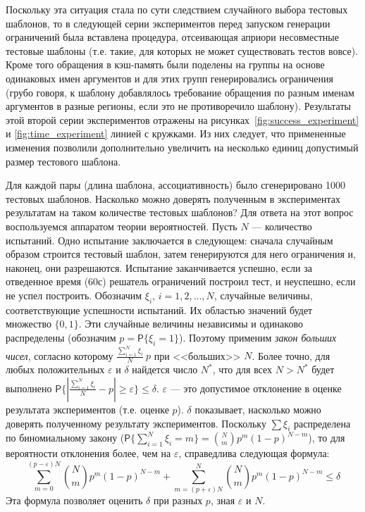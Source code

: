 \documentclass[14pt]{extreport}
\begin{document}
Поскольку эта ситуация стала по сути следствием случайного выбора тестовых
шаблонов, то в следующей серии экспериментов перед запуском генерации
ограничений была вставлена процедура, отсеивающая априори несовместные тестовые
шаблоны (т.е. такие, для которых не может существовать тестов вовсе). Кроме того
обращения в кэш-память были поделены на группы на основе одинаковых имен
аргументов и для этих групп генерировались ограничения (грубо говоря, к шаблону
добавлялось требование обращения по разным именам аргументов в разные регионы,
если это не противоречило шаблону). Результаты этой второй серии экспериментов
отражены на рисунках~\ref{fig:success_experiment} и \ref{fig:time_experiment}
линией с кружками. Из них следует, что примененные изменения позволили
дополнительно увеличить на несколько единиц допустимый размер тестового шаблона.

Для каждой пары (длина шаблона, ассоциативность) было сгенерировано 1000
тестовых шаблонов. Насколько можно доверять полученным в экспериментах
результатам на таком количестве тестовых шаблонов? Для ответа на этот вопрос воспользуемся аппаратом теории
вероятностей. Пусть $N$ --- количество испытаний. Одно испытание заключается в
следующем: сначала случайным образом строится тестовый шаблон, затем генерируются
для него ограничения и, наконец, они разрешаются. Испытание заканчивается успешно, если за отведенное время (60с) решатель ограничений построил тест, и неуспешно, если не успел построить.
Обозначим  $\xi_i$, $i = 1, 2, \dots, N$, случайные величины, соответствующие
успешности испытаний. Их областью значений будет множество $\{0, 1\}$. Эти
случайные величины независимы и одинаково распределены (обозначим $p =
\mathsf{P}\{\xi_i = 1\}$). Поэтому применим \emph{закон больших чисел}, согласно
которому $\frac{\sum_{i=1}^N \xi_i}{N} ~ p$ при <<больших>> $N$. Более точно, для любых
положительных $\varepsilon$ и $\delta$ найдется число $N^*$, что для всех $N > N^*$ будет
выполнено $\mathsf{P}\{|\frac{\sum_{i=1}^N \xi_i}{N} - p | \geq \varepsilon\} \leq \delta$. $\varepsilon$ --- это допустимое отклонение в оценке результата экспериментов (т.е. оценке $p$). $\delta$ показывает, насколько можно доверять полученному результату экспериментов. Поскольку $\sum \xi_i$ распределена по биномиальному закону ($\mathsf{P}\{\sum_{i=1}^N \xi_i = m\} = \binom{N}{m} p^m (1{-}p)^{N{-}m}$), то для вероятности отклонения более, чем на $\varepsilon$, справедлива следующая формула: $$\sum_{m = 0}^{(p-\varepsilon)N} \binom{N}{m} p^m (1{-}p)^{N{-}m} + \sum_{m = (p+\varepsilon)N}^N \binom{N}{m} p^m (1{-}p)^{N{-}m} \leq \delta$$ Эта формула позволяет оценить $\delta$ при разных $p$, зная $\varepsilon$ и $N$.
\end{document}
